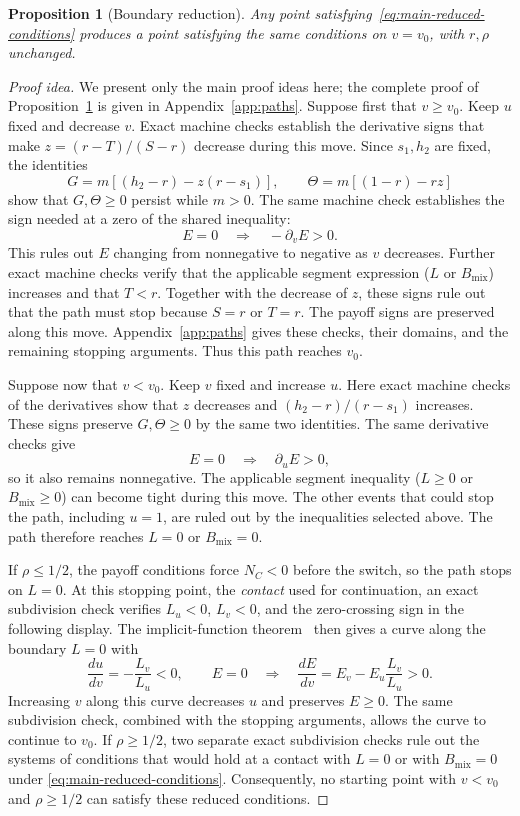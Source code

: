 \documentclass[11pt]{article}
\newtheorem{proposition}[theorem]{Proposition}
\theoremstyle{remark}
\theoremstyle{plain}
\begin{document}
\begin{proposition}[Boundary reduction]
\label{prop:boundary-reduction}
Any point satisfying~\eqref{eq:main-reduced-conditions} produces
a point satisfying the same conditions on $v=v_0$, with $r,\rho$
unchanged.
\end{proposition}
\begin{proof}[Proof idea]
We present only the main proof ideas here; the complete proof of
Proposition~\ref{prop:boundary-reduction} is given in Appendix~\ref{app:paths}.
Suppose first that $v\ge v_0$. Keep $u$ fixed and decrease $v$.
Exact machine checks establish the derivative signs that make
$z=(r-T)/(S-r)$ decrease during this move. Since
$s_1,h_2$ are fixed, the identities
\[
 G=m[(h_2-r)-z(r-s_1)],\qquad
 \Theta=m[(1-r)-rz]
\]
show that $G,\Theta\ge0$ persist while $m>0$.
The same machine check establishes the sign needed at a zero of
the shared inequality:
\[
 E=0\quad\Longrightarrow\quad -\partial_vE>0.
\]
This rules out $E$ changing from nonnegative to negative as $v$ decreases.
Further exact machine checks verify that the applicable segment
expression ($L$ or $B_{\mathrm{mix}}$) increases and that $T<r$.
Together with the decrease of $z$, these signs rule out that the
path must stop because $S=r$ or $T=r$.
The payoff signs are preserved along this move.
Appendix~\ref{app:paths} gives these checks, their domains, and the
remaining stopping arguments. Thus this path reaches $v_0$.

Suppose now that $v<v_0$. Keep $v$ fixed and increase $u$.
Here exact machine checks of the derivatives show that $z$
decreases and $(h_2-r)/(r-s_1)$ increases. These signs preserve $G,\Theta\ge0$ by the same two
identities. The same derivative checks give
\[
 E=0\quad\Longrightarrow\quad \partial_uE>0,
\]
so it also remains nonnegative. The applicable segment inequality
($L\ge0$ or $B_{\mathrm{mix}}\ge0$) can become tight during this
move. The other events that could stop the path, including $u=1$,
are ruled out by the inequalities selected above.
The path therefore reaches $L=0$ or $B_{\mathrm{mix}}=0$.

If $\rho\le1/2$, the payoff conditions force $N_C<0$ before the
switch, so the path stops on $L=0$. At this stopping point, the
\emph{contact} used for
continuation, an exact subdivision check verifies $L_u<0$, $L_v<0$,
and the zero-crossing sign in the following display.
The implicit-function theorem~\cite{rudin1976} then gives a
curve along the boundary $L=0$ with
\begin{equation}
 \frac{du}{dv}=-\frac{L_v}{L_u}<0,\qquad
 E=0\quad\Longrightarrow\quad
 \frac{dE}{dv}=E_v-E_u\frac{L_v}{L_u}>0.
 \label{eq:main-boundary-continuation}
\end{equation}
Increasing $v$ along this curve decreases $u$ and preserves
$E\ge0$. The same subdivision check, combined with the stopping arguments,
allows the curve to continue to $v_0$.
If $\rho\ge1/2$, two separate exact subdivision checks rule out the
systems of conditions that would hold at a contact with $L=0$ or
with $B_{\mathrm{mix}}=0$ under
\eqref{eq:main-reduced-conditions}. Consequently, no starting point
with $v<v_0$ and $\rho\ge1/2$ can satisfy these reduced conditions.


\end{proof}
\end{document}
